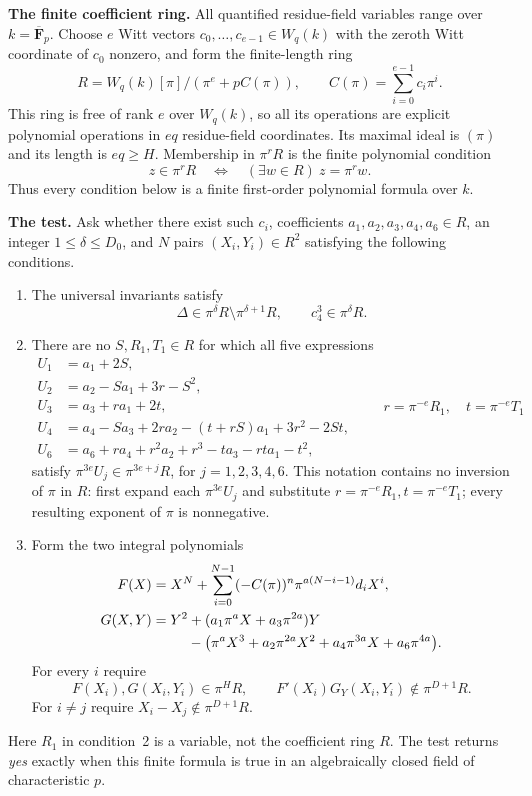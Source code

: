 \par\smallskip\noindent\textbf{The finite coefficient ring.}
All quantified residue-field variables range over $k=\overline{\mathbf F}_p$.
Choose $e$ Witt vectors $c_0,\ldots,c_{e-1}\in W_q(k)$ with the zeroth Witt coordinate of $c_0$ nonzero, and form the finite-length ring
\[
 R=W_q(k)[\pi]\big/\left(\pi^e+pC(\pi)\right),
 \qquad C(\pi)=\sum_{i=0}^{e-1}c_i\pi^i.
\]
This ring is free of rank $e$ over $W_q(k)$, so all its operations are explicit polynomial operations in $eq$ residue-field coordinates.  Its maximal ideal is $(\pi)$ and its length is $eq\geq H$.  Membership in $\pi^rR$ is the finite polynomial condition
\[
                  z\in\pi^rR\quad\Longleftrightarrow\quad
                  (\exists w\in R)\ z=\pi^rw.
\]
Thus every condition below is a finite first-order polynomial formula over $k$.

\par\smallskip\noindent\textbf{The test.}
Ask whether there exist such $c_i$, coefficients $a_1,a_2,a_3,a_4,a_6\in R$, an integer $1\leq\delta\leq D_0$, and $N$ pairs $(X_i,Y_i)\in R^2$ satisfying the following conditions.

\begin{enumerate}
\item The universal invariants satisfy
\[
 \Delta\in\pi^\delta R\setminus\pi^{\delta+1}R,
 \qquad c_4^3\in\pi^\delta R.
\]
\item There are no $S,R_1,T_1\in R$ for which all five expressions
\[
\begin{aligned}
 U_1&=a_1+2S,\\
 U_2&=a_2-Sa_1+3r-S^2,\\
 U_3&=a_3+ra_1+2t,\\
 U_4&=a_4-Sa_3+2ra_2-(t+rS)a_1+3r^2-2St,\\
 U_6&=a_6+ra_4+r^2a_2+r^3-ta_3-rta_1-t^2,
\end{aligned}
\qquad r=\pi^{-e}R_1,\quad t=\pi^{-e}T_1
\]
satisfy $\pi^{3e}U_j\in\pi^{3e+j}R$, for $j=1,2,3,4,6$.
This notation contains no inversion of $\pi$ in $R$: first expand each $\pi^{3e}U_j$ and substitute $r=\pi^{-e}R_1,t=\pi^{-e}T_1$; every resulting exponent of $\pi$ is nonnegative.
\item Form the two integral polynomials
\[
\begin{aligned}
 F(X)&=X^N+\sum_{i=0}^{N-1}
       (-C(\pi))^n\pi^{a(N-i-1)}d_iX^i,\\
 G(X,Y)&=Y^2+(a_1\pi^aX+a_3\pi^{2a})Y\\
 &\hspace{9mm}-\bigl(\pi^aX^3+a_2\pi^{2a}X^2
                   +a_4\pi^{3a}X+a_6\pi^{4a}\bigr).
\end{aligned}
\]
For every $i$ require
\[
 F(X_i),G(X_i,Y_i)\in\pi^HR,\qquad
 F'(X_i)G_Y(X_i,Y_i)\notin\pi^{D+1}R.
\]
For $i\ne j$ require $X_i-X_j\notin\pi^{D+1}R$.
\end{enumerate}
Here $R_1$ in condition~2 is a variable, not the coefficient ring $R$.
The test returns \emph{yes} exactly when this finite formula is true in an algebraically closed field of characteristic $p$.

